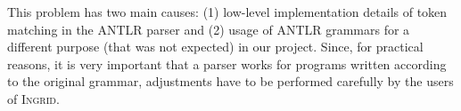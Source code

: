 This problem has two main causes: (1) low-level implementation details of token matching in the ANTLR parser and (2) usage of ANTLR grammars for a different purpose (that was not expected) in our project.
Since, for practical reasons, it is very important that a parser works for programs written according to the original grammar, adjustments have to be performed carefully by the users of \textsc{Ingrid}.

